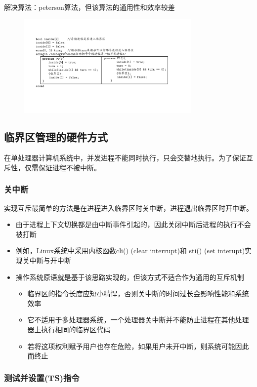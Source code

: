 \documentclass[cs4size,a4paper,10pt]{ctexart}
\begin{document}
	解决算法：peterson算法，但该算法的通用性和效率较差
	\begin{figure}[H]
		\centering
		\includegraphics[width=0.8\textwidth]{img/peterson算法.pdf}
	\end{figure}

	\subsection{临界区管理的硬件方式}
	在单处理器计算机系统中，并发进程不能同时执行，只会交替地执行。为了保证互斥性，仅需保证进程不被中断。

	\subsubsection{关中断}
	实现互斥最简单的方法是在进程进入临界区时关中断，进程退出临界区时开中断。
	\begin{itemize}
		\item 由于进程上下文切换都是由中断事件引起的，因此关闭中断后进程的执行不会被打断
		\item 例如，Linux系统中采用内核函数cli() (clear interrupt)和 sti() (set
		interupt)实现关中断与开中断
		\item 操作系统原语就是基于该思路实现的，但该方式不适合作为通用的互斥机制
		\begin{itemize}
			\item 临界区的指令长度应短小精悍，否则关中断的时间过长会影响性能和系统效率
			\item 它不适用于多处理器系统，一个处理器关中断并不能防止进程在其他处理器上执行相同的临界区代码
			\item 若将这项权利赋予用户也存在危险，如果用户未开中断，则系统可能因此而终止
		\end{itemize}
	\end{itemize}

	\subsubsection{测试并设置(TS)指令}
\end{document}
